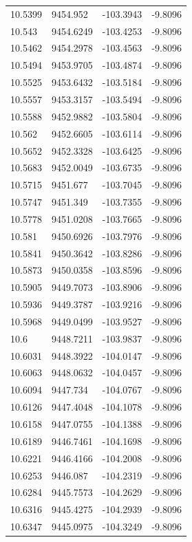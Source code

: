 \begin{table}[H]
\begin{tabular}{llll}
10.5399 & 9454.952 & -103.3943 & -9.8096 \\
10.543 & 9454.6249 & -103.4253 & -9.8096 \\
10.5462 & 9454.2978 & -103.4563 & -9.8096 \\
10.5494 & 9453.9705 & -103.4874 & -9.8096 \\
10.5525 & 9453.6432 & -103.5184 & -9.8096 \\
10.5557 & 9453.3157 & -103.5494 & -9.8096 \\
10.5588 & 9452.9882 & -103.5804 & -9.8096 \\
10.562 & 9452.6605 & -103.6114 & -9.8096 \\
10.5652 & 9452.3328 & -103.6425 & -9.8096 \\
10.5683 & 9452.0049 & -103.6735 & -9.8096 \\
10.5715 & 9451.677 & -103.7045 & -9.8096 \\
10.5747 & 9451.349 & -103.7355 & -9.8096 \\
10.5778 & 9451.0208 & -103.7665 & -9.8096 \\
10.581 & 9450.6926 & -103.7976 & -9.8096 \\
10.5841 & 9450.3642 & -103.8286 & -9.8096 \\
10.5873 & 9450.0358 & -103.8596 & -9.8096 \\
10.5905 & 9449.7073 & -103.8906 & -9.8096 \\
10.5936 & 9449.3787 & -103.9216 & -9.8096 \\
10.5968 & 9449.0499 & -103.9527 & -9.8096 \\
10.6 & 9448.7211 & -103.9837 & -9.8096 \\
10.6031 & 9448.3922 & -104.0147 & -9.8096 \\
10.6063 & 9448.0632 & -104.0457 & -9.8096 \\
10.6094 & 9447.734 & -104.0767 & -9.8096 \\
10.6126 & 9447.4048 & -104.1078 & -9.8096 \\
10.6158 & 9447.0755 & -104.1388 & -9.8096 \\
10.6189 & 9446.7461 & -104.1698 & -9.8096 \\
10.6221 & 9446.4166 & -104.2008 & -9.8096 \\
10.6253 & 9446.087 & -104.2319 & -9.8096 \\
10.6284 & 9445.7573 & -104.2629 & -9.8096 \\
10.6316 & 9445.4275 & -104.2939 & -9.8096 \\
10.6347 & 9445.0975 & -104.3249 & -9.8096 \\

\end{tabular}
\end{table}
